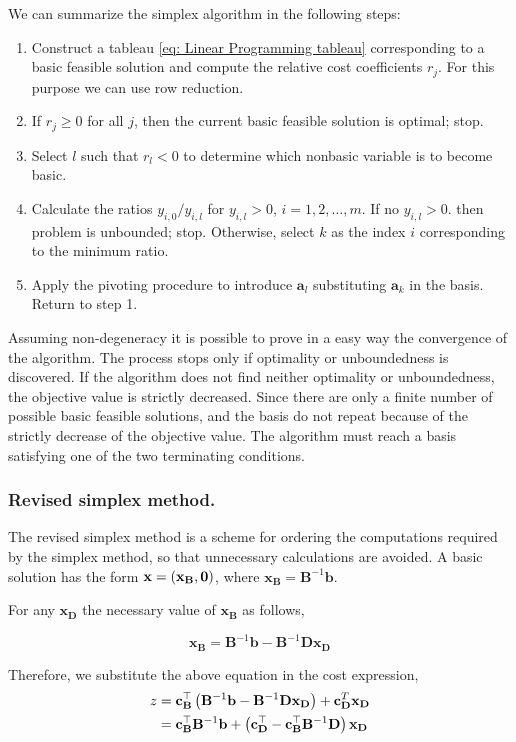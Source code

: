 We can summarize the simplex algorithm in the following steps:
\begin{enumerate}
	\item Construct a tableau \eqref{eq: Linear Programming tableau} corresponding to a basic feasible solution and compute the relative cost coefficients $r_j$. For this purpose we can use row reduction.
	\item If $r_j\geq 0$ for all $j$, then the current basic feasible solution is optimal; stop.
	\item Select $l$ such that $r_l<0$ to determine which nonbasic variable is to become basic.
	\item Calculate the ratios $y_{i,0}/y_{i,l}$ for $y_{i,l}>0$, $i=1,2,\dots, m$. If no $y_{i,l}>0$. then problem is unbounded; stop. Otherwise, select $k$ as the index $i$ corresponding to the minimum ratio. 
	\item Apply the pivoting procedure to introduce $\mathbf{a}_l$ substituting $\mathbf{a}_k$ in the basis. Return to step 1.
\end{enumerate} 
Assuming non-degeneracy it is possible to prove in a easy way the convergence of the algorithm. The process stops only if optimality or unboundedness is discovered.
If the algorithm does not find neither optimality or unboundedness, the objective value is strictly decreased. Since there are only a finite number of possible basic feasible solutions, and the basis do not repeat because of the strictly decrease of the objective value. The algorithm must reach a basis satisfying one of the two terminating conditions.
\\
\subsubsection{Revised simplex method.}
The revised simplex method is a scheme for ordering the computations required by the simplex method, so that unnecessary calculations are avoided. A basic solution has the form $\mathbf{x}=\left( \mathbf{x}_{\mathbf{B}}, \mathbf{0} \right)$, where $\mathbf{x}_\mathbf{B}=\mathbf{B}^{-1}\mathbf{b}$. 

For any $\mathbf{x}_{\mathbf{D}}$ the necessary value of $\mathbf{x}_{\mathbf{B}}$ as follows,

\begin{equation*}
	\mathbf{x}_{\mathbf{B}}=\mathbf{B}^{-1}\mathbf{b}-\mathbf{B}^{-1}\mathbf{D}\mathbf{x}_{\mathbf{D}}
\end{equation*}

Therefore, we substitute the above equation in the cost expression,
\begin{align*}
	z&=\mathbf{c}_{\mathbf{B}}^\top\left( \mathbf{B}^{-1}\mathbf{b}-\mathbf{B}^{-1}\mathbf{Dx}_{\mathbf D} \right)+\mathbf{c}_{\mathbf{D}}^T \mathbf{x}_{\mathbf D}\\
	&=\mathbf{c}_{\mathbf{B}}^\top\mathbf{B}^{-1}\mathbf{b}+\left( \mathbf{c}_{\mathbf{D}}^\top-\mathbf{c}_{\mathbf{B}}^\top\mathbf{B}^{-1}\mathbf{D} \right)\mathbf{x}_{\mathbf{D}}
\end{align*}


